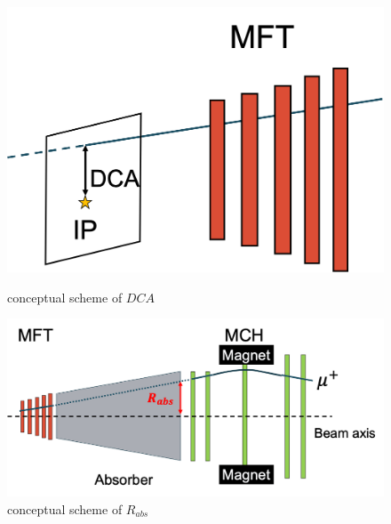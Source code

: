         \begin{figure}[htbp]
            \begin{minipage}{0.45\textwidth} %
                \centering
                \includegraphics[keepaspectratio, scale=0.15]{fig/3_3_DCA.png} %
                \caption{conceptual scheme of $DCA$}
                \label{Analysis:reco:DCA}
            \end{minipage}
            \hspace{0.5cm}
            \begin{minipage}{0.45\textwidth}
                \centering
                \includegraphics[keepaspectratio, scale=0.2]{fig/3_3_Rabs.png} %
                \caption{conceptual scheme of $R_{abs}$}
                \label{Analysis:reco:R_abs}
            \end{minipage}
        \end{figure}

